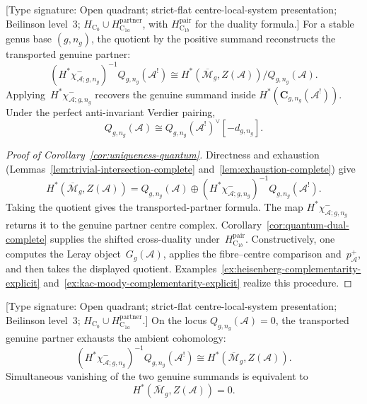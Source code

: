 \begin{corollary}
\label{cor:uniqueness-quantum}
\textup{[Type signature: Open quadrant; strict-flat
centre-local-system presentation; Beilinson level~3;
\(H_{\mathrm C_0}\cup H_{\mathrm C_{1a}}^{\mathrm{partner}}\),
with \(H_{\mathrm C_{1b}}^{\mathrm{pair}}\) for the duality formula.]}
For a stable genus base \((g,n_g)\), the quotient by the positive
summand reconstructs the transported genuine partner:
\begin{equation}
(H^*\chi^-_{\mathcal A;g,n_g})^{-1}Q_{g,n_g}(\mathcal A^!)
\cong
H^*(\overline{\mathcal M}_g,Z(\mathcal A))/Q_{g,n_g}(\mathcal A).
\end{equation}
Applying~$H^*\chi^-_{\mathcal A;g,n_g}$ recovers the genuine summand
inside $H^*(\mathbf C_{g,n_g}(\mathcal A^!))$.  Under the perfect
anti-invariant Verdier pairing,
\[
Q_{g,n_g}(\mathcal A)
\cong Q_{g,n_g}(\mathcal A^!)^\vee[-d_{g,n_g}].
\]
\end{corollary}

\begin{proof}[Proof of Corollary~\ref{cor:uniqueness-quantum}]
Directness and exhaustion
(Lemmas~\ref{lem:trivial-intersection-complete}
and~\ref{lem:exhaustion-complete}) give
\begin{equation}
H^*(\overline{\mathcal{M}}_g,Z(\mathcal{A}))
=Q_{g,n_g}(\mathcal{A})\oplus
(H^*\chi^-_{\mathcal A;g,n_g})^{-1}Q_{g,n_g}(\mathcal{A}^!).
\end{equation}
Taking the quotient gives the transported-partner formula.  The map
$H^*\chi^-_{\mathcal A;g,n_g}$ returns it to the genuine partner
centre complex.  Corollary~\ref{cor:quantum-dual-complete} supplies
the shifted cross-duality under~$H_{\mathrm C_{1b}}^{\mathrm{pair}}$.
Constructively, one computes the Leray object~$G_g(\mathcal A)$,
applies the fibre--centre comparison and~$p^+_{\mathcal A}$, and then
takes the displayed quotient.  Examples~\ref{ex:heisenberg-complementarity-explicit}
and~\ref{ex:kac-moody-complementarity-explicit} realize this procedure.
\end{proof}

\begin{corollary}
\label{cor:vanishing-quantum}
\textup{[Type signature: Open quadrant; strict-flat
centre-local-system presentation; Beilinson level~3;
\(H_{\mathrm C_0}\cup H_{\mathrm C_{1a}}^{\mathrm{partner}}\).]}
On the locus $Q_{g,n_g}(\mathcal A)=0$, the transported genuine
partner exhausts the ambient cohomology:
\begin{equation}
(H^*\chi^-_{\mathcal A;g,n_g})^{-1}Q_{g,n_g}(\mathcal{A}^!)
\cong H^*(\overline{\mathcal{M}}_g,Z(\mathcal{A})).
\end{equation}
Simultaneous vanishing of the two genuine summands is equivalent to
\begin{equation}
H^*(\overline{\mathcal{M}}_g,Z(\mathcal{A}))=0.
\end{equation}
\end{corollary}

